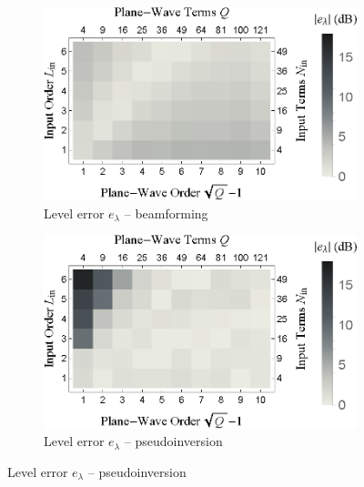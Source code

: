 \begin{figure}[t]
    	\centering
    	\begin{subfigure}[b]{0.49\textwidth}
        		\includegraphics[width=\textwidth]{07_characterization_extrapolation/figures/audibleEnergy_order_pwt-bf.eps}
        		\caption{Level error $e_\lambda$ -- beamforming}
        		\label{fig:07_Characterization_Extrapolation:Level_Order:PWT-bf}
    	\end{subfigure}
	\hfill
    	\begin{subfigure}[b]{0.49\textwidth}
        		\includegraphics[width=\textwidth]{07_characterization_extrapolation/figures/audibleEnergy_order_pwt-pinv.eps}
        		\caption{Level error $e_\lambda$  -- pseudoinversion}
        		\label{fig:07_Characterization_Extrapolation:Level_Order:PWT-pinv}
    	\end{subfigure}
	

\end{figure}
